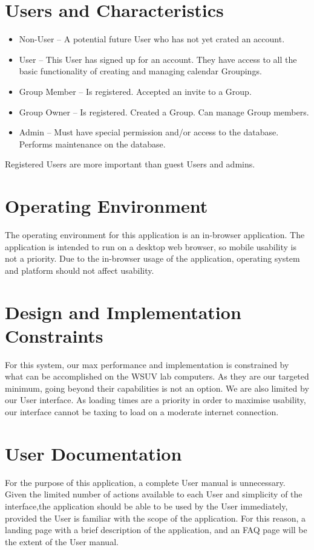 \documentclass{scrreprt}
\begin{document}
\section{Users and Characteristics}
\begin{itemize}
	\item Non-User – A potential future User who has not yet crated an account.
    \item User – This User has signed up for an account. They have access to
all the basic functionality of creating and managing calendar Groupings.
    \item Group Member – Is registered. Accepted an invite to a Group.
    \item Group Owner – Is registered. Created a Group. Can manage Group members.
    \item Admin – Must have special permission and/or access to the database. Performs
maintenance on the database.
\end{itemize}
Registered Users are more important than guest Users and admins.

\section{Operating Environment}
The operating environment for this application is an in-browser application. The
application is intended to run on a desktop web browser, so mobile usability is
not a priority. Due to the in-browser usage of the application, operating system
and platform should not affect usability.

\section{Design and Implementation Constraints}
For this system, our max performance and implementation is constrained by what
can be accomplished on the WSUV lab computers. As they are our targeted minimum,
going beyond their capabilities is not an option. We are also limited by our User
interface. As loading times are a priority in order to maximise usability, our
interface cannot be taxing to load on a moderate internet connection.

\section{User Documentation}
For the purpose of this application, a complete User manual is unnecessary.
Given the limited number of actions available to each User and simplicity of the
interface,the application should be able to be used by the User immediately,
provided the User is familiar with the scope of the application. For this
reason, a landing page with a brief description of the application, and an FAQ
page will be the extent of the User manual.
\end{document}
